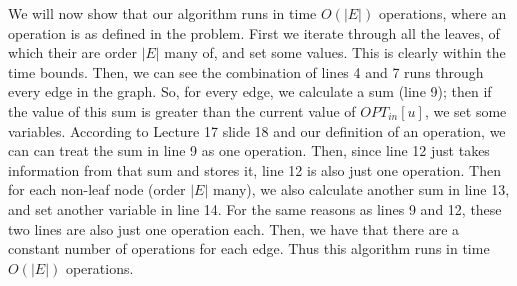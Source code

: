 \documentclass{article}
\begin{document}
\vspace{5mm}
We will now show that our algorithm runs in time $O(|E|)$ operations, where an
operation is as defined in the problem. First we iterate through all the leaves,
of which their are order $|E|$ many of, and set some values. This is clearly
within the time bounds. Then, we can see the combination of lines 4
and 7 runs through every edge in the graph. So, for every edge, we
calculate a sum (line 9); then if the value of this sum is greater than the
current value of $OPT_{in}[u]$, we set some variables. According to Lecture 17
slide 18 and our definition of an operation, we can can treat the sum in line 9
as one operation. Then, since line 12 just takes information from that sum and
stores it, line
12 is also just one operation. Then for each non-leaf node (order $|E|$ many),
we also calculate another sum
in line 13, and set another variable in line 14. For the same reasons as lines 9
and 12, these two lines are also just one operation each. Then, we have that
there are a constant number of operations for each edge. Thus this algorithm
runs in time $O(|E|)$ operations.
\end{document}
